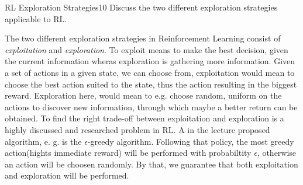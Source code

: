 
\begin{questions}
	

\begin{question}{RL Exploration Strategies}{10}
	Discuss the two different exploration strategies applicable to RL.
	
\begin{answer}
The two different exploration strategies in Reinforcement Learning consist of \textit{exploitation}
and \textit{exploration}. To exploit means to make the best decision, given the current information wheras exploration is gathering more information. Given a set of actions in a given state, we can choose from, exploitation would mean to choose the best action suited to the state, thus the action resulting in the biggest reward. Exploration here, would mean to e.g. choose random, uniform on the actions to discover new information, through which maybe a better return can be obtained. To find the right trade-off between exploitation and exploration is a highly discussed and researched problem in RL. A in the lecture proposed algorithm, e. g. is the $\epsilon$-greedy algorithm. Following that policy, the most greedy action(hights immediate reward) will be performed with probabiltity $\epsilon$, otherwise an action will be choosen randomly. By that, we guarantee that both exploitation and exploration will be performed.
\end{answer}
\end{question}




\end{questions}